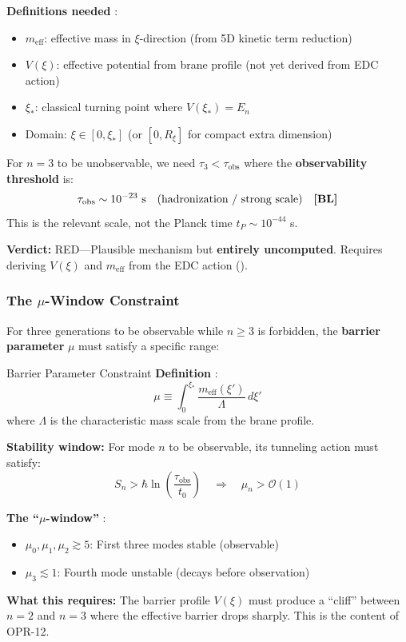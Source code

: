 \textbf{Definitions needed} \tagOpen{}:
\begin{itemize}[nosep]
\item $m_{\text{eff}}$: effective mass in $\xi$-direction (from 5D kinetic term reduction)
\item $V(\xi)$: effective potential from brane profile (not yet derived from EDC action)
\item $\xi_*$: classical turning point where $V(\xi_*) = E_n$
\item Domain: $\xi \in [0, \xi_*]$ (or $[0, R_\xi]$ for compact extra dimension)
\end{itemize}

For $n = 3$ to be unobservable, we need $\tau_3 < \tau_{\text{obs}}$ where the
\textbf{observability threshold} is:
\begin{equation}
\tau_{\text{obs}} \sim 10^{-23} \text{ s} \quad \text{(hadronization / strong scale)} \quad \textbf{[BL]}{}
\end{equation}
This is the relevant scale, not the Planck time $t_P \sim 10^{-44}$ s.

\textbf{Verdict:} RED---Plausible mechanism but \textbf{entirely uncomputed}.
Requires deriving $V(\xi)$ and $m_{\text{eff}}$ from the EDC action ().

\subsubsection{The $\mu$-Window Constraint}

For three generations to be observable while $n \geq 3$ is forbidden, the
\textbf{barrier parameter} $\mu$ must satisfy a specific range:

\begin{mechanism}{Barrier Parameter Constraint}
\textbf{Definition} \tagDer{}:
\begin{equation}
\mu \equiv \int_0^{\xi_*} \frac{m_{\text{eff}}(\xi')}{\Lambda} \, d\xi'
\label{eq:mu_barrier}
\end{equation}
where $\Lambda$ is the characteristic mass scale from the brane profile.

\textbf{Stability window:}
For mode $n$ to be observable, its tunneling action must satisfy:
\begin{equation}
S_n > \hbar \ln\left(\frac{\tau_{\text{obs}}}{t_0}\right)
\quad\Rightarrow\quad
\mu_n > \mathcal{O}(1)
\end{equation}

\textbf{The ``$\mu$-window''} \tagP{}:
\begin{itemize}[nosep]
\item $\mu_0, \mu_1, \mu_2 \gtrsim 5$: First three modes stable (observable)
\item $\mu_3 \lesssim 1$: Fourth mode unstable (decays before observation)
\end{itemize}

\textbf{What this requires:}
The barrier profile $V(\xi)$ must produce a ``cliff'' between $n = 2$ and $n = 3$
where the effective barrier drops sharply. This is the content of OPR-12.
\end{mechanism}

